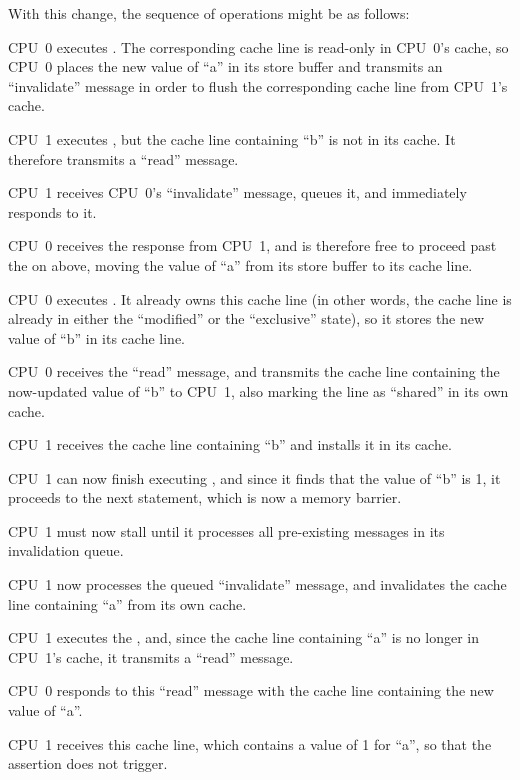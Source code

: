 \begin{fcvref}
With this change, the sequence of operations might be as follows:
\begin{sequence}
\item	CPU~0 executes .  The corresponding
	cache line is read-only in
	CPU~0's cache, so CPU~0 places the new value of ``a'' in its
	store buffer and transmits an ``invalidate'' message in order
	to flush the corresponding cache line from CPU~1's cache.
\item	CPU~1 executes , but the cache line
	containing ``b'' is not in its cache.
	It therefore transmits a ``read'' message.
\item	CPU~1 receives CPU~0's ``invalidate'' message, queues it, and
	immediately responds to it.
\item	CPU~0 receives the response from CPU~1, and is therefore free
	to proceed past the  on  above, moving
	the value of ``a'' from its store buffer to its cache line.
\item	CPU~0 executes .
	It already owns this cache line (in other words, the cache line
	is already in either the ``modified'' or the ``exclusive'' state),
	so it stores the new value of ``b'' in its cache line.
\item	CPU~0 receives the ``read'' message, and transmits the
	cache line containing the now-updated value of ``b''
	to CPU~1, also marking the line as ``shared'' in its own cache.
\item	CPU~1 receives the cache line containing ``b'' and installs
	it in its cache.
\item	CPU~1 can now finish executing ,
	and since it finds that the value of ``b'' is 1, it proceeds
	to the next statement, which is now a memory barrier.
\item	CPU~1 must now stall until it processes all pre-existing
	messages in its invalidation queue.
\item	CPU~1 now processes the queued
	``invalidate'' message, and
	invalidates the cache line containing ``a'' from its own cache.
\item	CPU~1 executes the , and, since the
	cache line containing ``a'' is no longer in CPU~1's cache,
	it transmits a ``read'' message.
\item	CPU~0 responds to this ``read'' message with the cache line
	containing the new value of ``a''.
\item	CPU~1 receives this cache line, which contains a value of 1 for
	``a'', so that the assertion does not trigger.
\end{sequence}
\end{fcvref}

